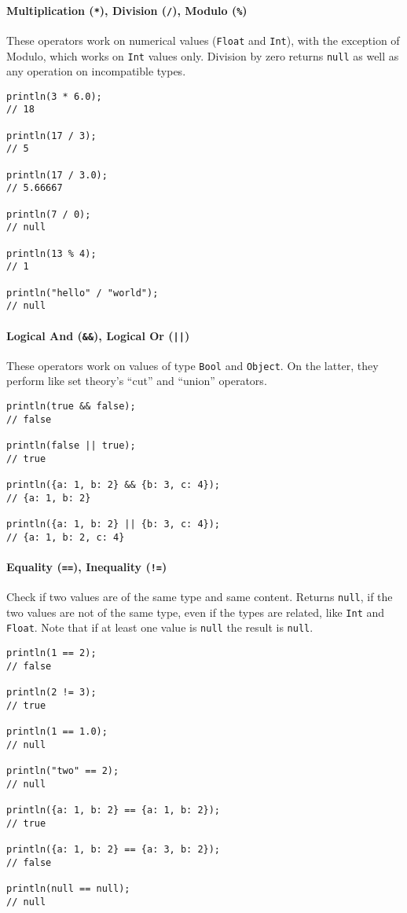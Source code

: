 \documentclass[a4paper, parskip, 10pt]{scrartcl}
\begin{document}
\paragraph{Multiplication (\texttt{*}), Division (\texttt{/}), Modulo
(\texttt{\%})}
These operators work on numerical values (\texttt{Float} and \texttt{Int}),
with the exception of Modulo, which works on \texttt{Int} values only. Division
by zero returns \texttt{null} as well as any operation on incompatible types.

\begin{lstlisting}
println(3 * 6.0);
// 18

println(17 / 3);
// 5

println(17 / 3.0);
// 5.66667

println(7 / 0);
// null

println(13 % 4);
// 1

println("hello" / "world");
// null
\end{lstlisting}

\paragraph{Logical And (\texttt{\&\&}), Logical Or (\texttt{||})}
These operators work on values of type \texttt{Bool} and \texttt{Object}. On
the latter, they perform like set theory's \enquote{cut} and \enquote{union}
operators.

\begin{lstlisting}
println(true && false);
// false

println(false || true);
// true

println({a: 1, b: 2} && {b: 3, c: 4});
// {a: 1, b: 2}

println({a: 1, b: 2} || {b: 3, c: 4});
// {a: 1, b: 2, c: 4}
\end{lstlisting}

\paragraph{Equality (\texttt{==}), Inequality (\texttt{!=})}
Check if two values are of the same type and same content. Returns
\texttt{null}, if the two values are not of the same type, even if the types
are related, like \texttt{Int} and \texttt{Float}. Note that if at least one
value is \texttt{null} the result is \texttt{null}.

\begin{lstlisting}
println(1 == 2);
// false

println(2 != 3);
// true

println(1 == 1.0);
// null

println("two" == 2);
// null

println({a: 1, b: 2} == {a: 1, b: 2});
// true

println({a: 1, b: 2} == {a: 3, b: 2});
// false

println(null == null);
// null
\end{lstlisting}
\end{document}
